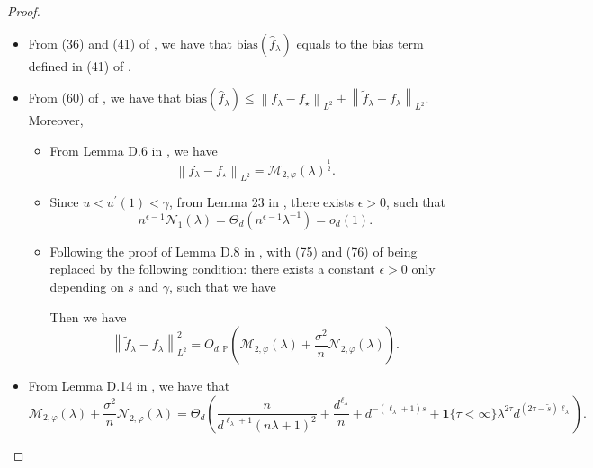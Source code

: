 \documentclass{article}
\theoremstyle{plain}
\theoremstyle{definition}
\theoremstyle{remark}
\newcommand{\bbP}{\mathbb{P}}
\newcommand{\calN}{\mathcal{N}}
\begin{document}
\begin{appendix}
\begin{proof}
\begin{itemize}
  Then, following the proof of Lemma D.8 in \cite{lu2024saturation}, where (75) and (76) therein are restated as (\ref{eqn:check_condition_bias_3}), we obtain the desired bounds for the bias term $\mathrm{bias}^{2}(\hat{f}_{\lambda})$.
  

\iffalse   
        \item From (36) and (41) of \cite{lu2024saturation}, we have that $\mathrm{bias}(\hat{f}_{\lambda})$ equals to the bias term defined in (41) of \cite{lu2024saturation}.

        \item From (60) of \cite{lu2024saturation}, we have that $\mathrm{bias}(\hat{f}_{\lambda}) \leq \left\| f_{\lambda} - f_{\star}\right\|_{L^{2}} 
    +
    \left\| \tilde{f}_{\lambda} - f_{\lambda}\right\|_{L^{2}}$. Moreover, 
    \begin{itemize}
        \item From Lemma D.6 in \cite{lu2024saturation}, we have 
        $$
        \left\| f_{\lambda} - f_{\star}\right\|_{L^{2}} = \mathcal{M}_{2, \varphi}(\lambda)^{\frac{1}{2}}.
        $$

        \item Since $u < u^{\prime}(1) < \gamma$, from Lemma 23 in \cite{zhang2024optimal}, there exists $\epsilon>0$, such that
        $$
        n^{\epsilon - 1}\mathcal{N}_{1}(\lambda) = \Theta_d(n^{\epsilon - 1} \lambda^{-1})= o_d(1).
        $$

        \item Following the proof of Lemma D.8 in \cite{lu2024saturation}, with (75) and (76) of \cite{lu2024saturation} being replaced by the following condition: 
        there exists a constant $\epsilon>0$ only depending on $s$ and $\gamma$, such that we have

 Then we have 
 \begin{equation*}
        \left\| \tilde{f}_{\lambda} - f_{\lambda}\right\|_{L^{2}}^2 = O_{d, \bbP}\left( \mathcal{M}_{2, \varphi}(\lambda) + \frac{\sigma^2}{n} \calN_{2,\varphi}(\lambda)  \right).
    \end{equation*}

  
    \end{itemize}
        

        \item From Lemma D.14 in \cite{lu2024saturation}, we have that 
        $$
      \mathcal{M}_{2, \varphi}(\lambda) +  \frac{\sigma^2}{n}\mathcal{N}_{2, \varphi}(\lambda) = 
    \Theta_{d} \left( \frac{n}{d^{\ell_{\lambda}+1}(n\lambda+1)^{2}} + \frac{d^{\ell_{\lambda}}}{n} + 
    d^{-(\ell_{\lambda}+1)s}
    +\mathbf{1}\{\tau<\infty\}\lambda^{2\tau}d^{(2\tau-\tilde{s})\ell_{\lambda} }\right).
        $$


\end{itemize}
\end{proof}
\end{appendix}
\end{document}
